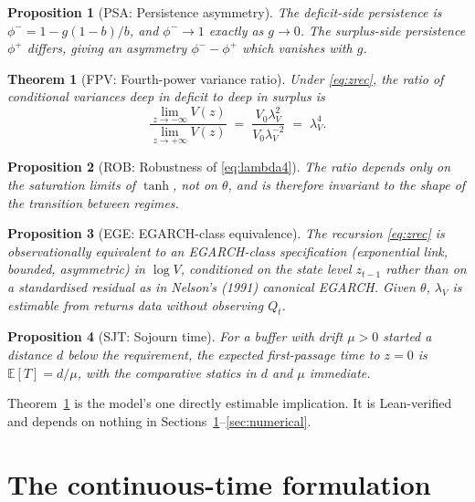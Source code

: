 \documentclass[11pt]{article}
\newtheorem{proposition}{Proposition}
\newtheorem{theorem}{Theorem}
\theoremstyle{remark}
\newcommand{\E}{\mathbb{E}}
\begin{document}
\begin{proposition}[PSA: Persistence asymmetry]
\label{prop:persistence}
The deficit-side persistence is
$\phi^- = 1 - g(1-b)/b$, and $\phi^- \to 1$ exactly as $g \to 0$. The
surplus-side persistence $\phi^+$ differs, giving an asymmetry
$\phi^- - \phi^+$ which vanishes with $g$.
\end{proposition}

\begin{theorem}[FPV: Fourth-power variance ratio]
\label{thm:lambda4}
Under \eqref{eq:zrec}, the ratio of conditional variances deep in deficit
to deep in surplus is
\begin{equation}
\frac{\lim_{z\to-\infty} V(z)}{\lim_{z\to+\infty} V(z)}
\;=\; \frac{V_0\lambda_V^2}{V_0\lambda_V^{-2}} \;=\; \lambda_V^4 .
\label{eq:lambda4}
\end{equation}
\end{theorem}

\begin{proposition}[ROB: Robustness of \eqref{eq:lambda4}]
\label{prop:robust}
The ratio depends only on the saturation limits of $\tanh$, not on
$\theta$, and is therefore invariant to the shape of the transition between
regimes.
\end{proposition}

\begin{proposition}[EGE: EGARCH-class equivalence]
\label{prop:egarch}
The recursion \eqref{eq:zrec} is observationally equivalent to an
EGARCH-class specification (exponential link, bounded, asymmetric) in
$\log V$, conditioned on the state level $z_{t-1}$ rather than on a
standardised residual as in Nelson's (1991) canonical EGARCH. Given
$\theta$, $\lambda_V$ is estimable from returns data without observing $Q_t$.
\end{proposition}

\begin{proposition}[SJT: Sojourn time]
\label{prop:sojourn}
For a buffer with drift $\mu>0$ started a distance $d$ below the
requirement, the expected first-passage time to $z=0$ is
$\E[T] = d/\mu$, with the comparative statics in $d$ and $\mu$ immediate.
\end{proposition}

\noindent
Theorem~\ref{thm:lambda4} is the model's one directly estimable
implication. It is Lean-verified and depends on nothing in
Sections~\ref{sec:formulation}--\ref{sec:numerical}.

\section{The continuous-time formulation}
\label{sec:formulation}
\end{document}
